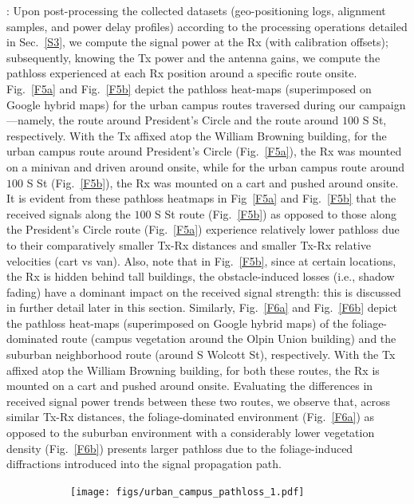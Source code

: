 \documentclass[10pt, twocolumn]{IEEEtran}
\begin{document}
{: Upon post-processing the collected datasets (geo-positioning logs, alignment samples, and power delay profiles) according to the processing operations detailed in Sec.~\ref{S3}, we compute the signal power at the Rx (with calibration offsets); subsequently, knowing the Tx power and the antenna gains, we compute the pathloss experienced at each Rx position around a specific route onsite. Fig.~\ref{F5a} and Fig.~\ref{F5b} depict the pathloss heat-maps (superimposed on Google hybrid maps) for the urban campus routes traversed during our campaign---namely, the route around President's Circle and the route around $100$ S St, respectively. With the Tx affixed atop the William Browning building, for the urban campus route around President's Circle (Fig.~\ref{F5a}), the Rx was mounted on a minivan and driven around onsite, while for the urban campus route around $100$ S St (Fig.~\ref{F5b}), the Rx was mounted on a cart and pushed around onsite. It is evident from these pathloss heatmaps in Fig~\ref{F5a} and Fig.~\ref{F5b} that the received signals along the $100$ S St route (Fig.~\ref{F5b}) as opposed to those along the President's Circle route (Fig.~\ref{F5a}) experience relatively lower pathloss due to their comparatively smaller Tx-Rx distances and smaller Tx-Rx relative velocities (cart vs van). Also, note that in Fig.~\ref{F5b}, since at certain locations, the Rx is hidden behind tall buildings, the obstacle-induced losses (i.e., shadow fading) have a dominant impact on the received signal strength: this is discussed in further detail later in this section. Similarly, Fig.~\ref{F6a} and Fig.~\ref{F6b} depict the pathloss heat-maps (superimposed on Google hybrid maps) of the foliage-dominated route (campus vegetation around the Olpin Union building) and the suburban neighborhood route (around S Wolcott St), respectively. With the Tx affixed atop the William Browning building, for both these routes, the Rx is mounted on a cart and pushed around onsite. Evaluating the differences in received signal power trends between these two routes, we observe that, across similar Tx-Rx distances, the foliage-dominated environment (Fig.~\ref{F6a}) as opposed to the suburban environment with a considerably lower vegetation density (Fig.~\ref{F6b}) presents larger pathloss due to the foliage-induced diffractions introduced into the signal propagation path.
\begin{figure} [t]
    \centering
    \begin{subfigure}{0.564\linewidth}
        \centering
        \texttt{[image: figs/urban\_campus\_pathloss\_1.pdf]}

\end{subfigure}
\end{figure}}
\end{document}
